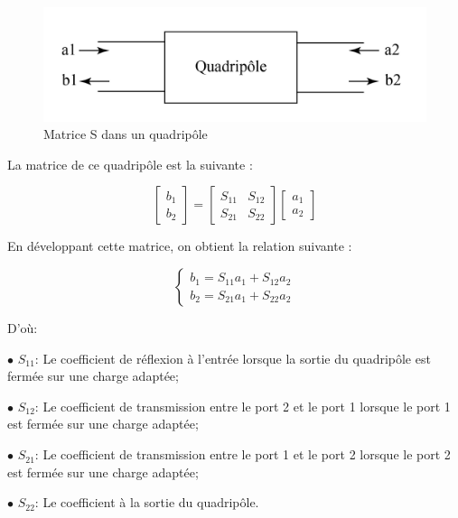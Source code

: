 \documentclass[french]{article}
\begin{document}
\begin{figure}[H]
	\centering
	\includegraphics[width=0.9\linewidth]{../5SynthAmp/Matrice_S}
	\caption{Matrice S dans un quadripôle}
	\label{fig:matrice_s}
\end{figure}

La matrice de ce quadripôle est la suivante :

\begin{equation}
	\begin{bmatrix}
		b_{1}\\
		b_{2}
	\end{bmatrix}
	=
	\begin{bmatrix}
		S_{11} & S_{12}\\
		S_{21} & S_{22}
	\end{bmatrix}
	\begin{bmatrix}
		a_{1}\\
		a_{2}
	\end{bmatrix}
\end{equation}

En développant cette matrice, on obtient la relation suivante :

\begin{equation}
	\left\{\begin{matrix}
		b_{1}=S_{11}a_{1}+S_{12}a_{2}\\
		b_{2}=S_{21}a_{1}+S_{22}a_{2}
	\end{matrix}\right.
	\label{eqmatrix}
\end{equation}

D’où:

$\bullet$ $S_{11}$: Le coefficient de réflexion à l’entrée lorsque la sortie du quadripôle est fermée sur une charge adaptée;

$\bullet$ $S_{12}$: Le coefficient de transmission entre le port 2 et le port 1 lorsque le port 1 est fermée sur une charge adaptée;

$\bullet$ $S_{21}$: Le coefficient de transmission entre le port 1 et le port 2 lorsque le port 2 est fermée sur une charge adaptée;

$\bullet$ $S_{22}$: Le coefficient à la sortie du quadripôle.
\end{document}
